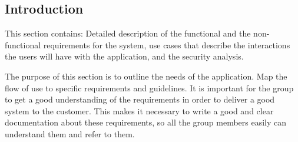 \subsection{Introduction}
This section contains: Detailed description of the functional and the non-functional requirements
for the system, use cases that describe the interactions the users will have with the 
application, and the security analysis.

The purpose of this section is to outline the needs of the application.
Map the flow of use to specific requirements and guidelines.
It is important for the group to get a good understanding of the requirements in order to deliver 
a good system to the customer. 
This makes it necessary to write a good and clear documentation about these requirements, 
so all the group members easily can understand them and refer to them.
